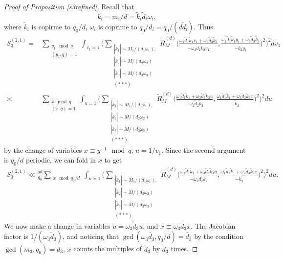 \begin{proof}[Proof of Proposition \ref{s3refined}]
    Recall that \[
        k_i = m_i/d = \tilde{k}_i \tilde{d}_i \omega_i,
    \]  
    where $\tilde{k}_i$ is copirme to $q_0/d$, $\omega_i$ is coprime to $q_0/d_i = q_0/(d\tilde{d}_i)$.
    Thus 
    \begin{align*}
        S_3^{(2,1)}=&\sum_{\substack{y_1\mod q\\ (y_1,q)=1} }\int_{v_1\asymp 1}\Bigg(\sum_{\substack{|\tilde{k}_1|\sim M_1/(d_1\omega_1),\\|\tilde{k}_2|\sim M/(d_2\omega_2)\\|\tilde{k}_3|\sim M/(d_3\omega_3)\\
        (***)}}
        \tilde{R}_M^{(d)}\Big(\frac{\omega_1\tilde{d}_1\tilde{k}_1v_1+\omega_3\tilde{d}_3\tilde{k}_3}{-\omega_2\tilde{d}_2\tilde{k}_2v_1},\frac{\omega_1\tilde{d}_1\tilde{k}_1y_1+\omega_3\tilde{d}_3\tilde{k}_3}{-\tilde{k}_2y_1}\Big)^2\Bigg)^2 dv_1
        \\
        \asymp& \sum_{\substack{x \mod q\\ (x,q)=1} }\int_{u\asymp 1}\Bigg(\sum_{\substack{|\tilde{k}_1|\sim M_1/(d_1\omega_1),\\|\tilde{k}_2|\sim M/(d_2\omega_2)\\|\tilde{k}_3|\sim M/(d_3\omega_3)\\
        (***)}}
        \tilde{R}_M^{(d)}\Big(\frac{\omega_1\tilde{d}_1\tilde{k}_1+\omega_3\tilde{d}_3\tilde{k}_3u}{-\omega_2\tilde{d}_2\tilde{k}_2},\frac{\omega_1\tilde{d}_1\tilde{k}_1+\omega_3\tilde{d}_3\tilde{k}_3 x}{-\tilde{k}_2}\Big)^2\Bigg)^2 du
    \end{align*}
    by the change of variables $x\equiv y^{-1}\mod q$, $u=1/v_1$.
    Since the second argument is $q_0/d$ periodic, we can fold in $x$ to get \begin{align*}
        S_3^{(2,1)}\ll
        \frac{qd}{q_0} \sum_{\substack{x \mod q_0/d} }\int_{u\asymp 1}\Bigg(\sum_{\substack{|\tilde{k}_1|\sim M_1/(d_1\omega_1),\\|\tilde{k}_2|\sim M/(d_2\omega_2)\\|\tilde{k}_3|\sim M/(d_3\omega_3)\\
        (***)}}
        \tilde{R}_M^{(d)}\Big(\frac{\omega_1\tilde{d}_1\tilde{k}_1+\omega_3\tilde{d}_3\tilde{k}_3u}{-\omega_2\tilde{d}_2\tilde{k}_2},\frac{\omega_1\tilde{d}_1\tilde{k}_1+\omega_3\tilde{d}_3\tilde{k}_3 x}{-\tilde{k}_2}\Big)^2\Bigg)^2 du.
    \end{align*}
    We now make a change in variables $\tilde{u} = \omega_3\tilde{d}_3u$, and $\tilde{x}\equiv \omega_3\tilde{d_3}x$. The Jacobian factor is $1/(\omega_3\tilde{d}_3)$, and noticing that $\gcd(\omega_3\tilde{d_3},q_0/d) = \tilde{d_3}$ by the condition $\gcd(m_3,q_0) =d_3$, $\tilde{x}$ counts the multiples of $\tilde{d}_3$ by $\tilde{d}_3$ times.

\end{proof}
